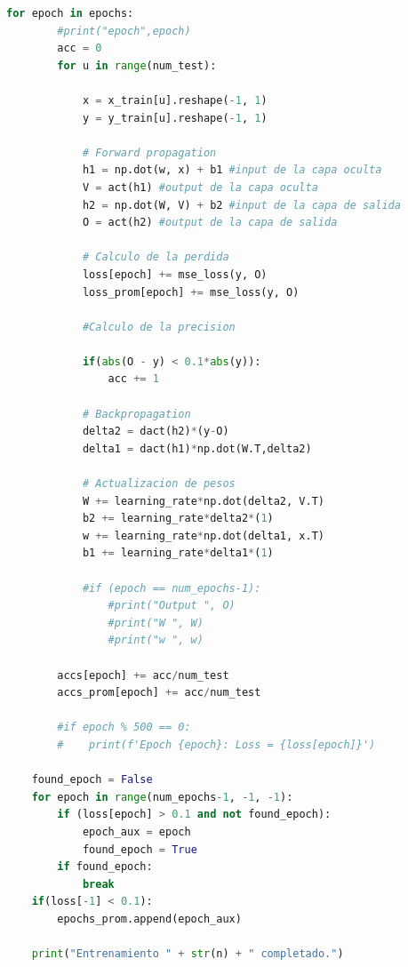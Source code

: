 \documentclass[11pt,twocolumn,twoside]{opticajnl}
\begin{document}
\begin{onecolumn}
\begin{lstlisting}[language=Python, caption={Ejercicio 1 - Arquitectura 2-2-1}, label=ej1]
    for epoch in epochs:
        #print("epoch",epoch)
        acc = 0  
        for u in range(num_test):

            x = x_train[u].reshape(-1, 1)
            y = y_train[u].reshape(-1, 1)

            # Forward propagation
            h1 = np.dot(w, x) + b1 #input de la capa oculta
            V = act(h1) #output de la capa oculta
            h2 = np.dot(W, V) + b2 #input de la capa de salida
            O = act(h2) #output de la capa de salida

            # Calculo de la perdida
            loss[epoch] += mse_loss(y, O)
            loss_prom[epoch] += mse_loss(y, O)

            #Calculo de la precision 
    
            if(abs(O - y) < 0.1*abs(y)):
                acc += 1

            # Backpropagation
            delta2 = dact(h2)*(y-O)
            delta1 = dact(h1)*np.dot(W.T,delta2)

            # Actualizacion de pesos
            W += learning_rate*np.dot(delta2, V.T) 
            b2 += learning_rate*delta2*(1) 
            w += learning_rate*np.dot(delta1, x.T) 
            b1 += learning_rate*delta1*(1) 

            #if (epoch == num_epochs-1):
                #print("Output ", O)
                #print("W ", W)
                #print("w ", w)
        
        accs[epoch] += acc/num_test
        accs_prom[epoch] += acc/num_test

        #if epoch % 500 == 0:
        #    print(f'Epoch {epoch}: Loss = {loss[epoch]}')

    found_epoch = False
    for epoch in range(num_epochs-1, -1, -1):
        if (loss[epoch] > 0.1 and not found_epoch):
            epoch_aux = epoch
            found_epoch = True
        if found_epoch:
            break
    if(loss[-1] < 0.1):
        epochs_prom.append(epoch_aux)

    print("Entrenamiento " + str(n) + " completado.")


\end{lstlisting}
\end{onecolumn}
\end{document}
